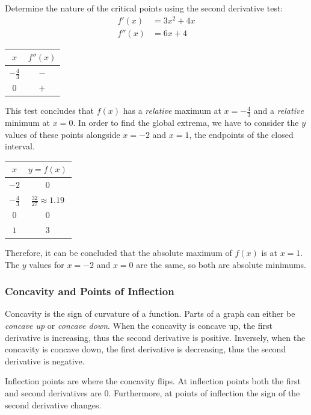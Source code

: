 \documentclass[12pt]{article}
\begin{document}
\noindent Determine the nature of the critical points using the second derivative test:
\begin{align*}
	f'(x) &= 3x^2 + 4x \\
	f''(x) &= 6x + 4
\end{align*}
\begin{table}[H]
	\centering
	\begin{tabular}{|c|c|}
		\hline
		$x$ & $f''(x)$ \\
		\hline \hline
		$-\frac{4}{3}$ & $-$ \\
		\hline
		$0$ & $+$ \\
		\hline
	\end{tabular}
\end{table}

\noindent This test concludes that $f(x)$ has a \textit{relative} maximum at $x = -\frac{4}{3}$ and a \textit{relative} minimum at $x = 0$. In order to find the global extrema, we have to consider the $y$ values of these points alongside $x = -2$ and $x = 1$, the endpoints of the closed interval.
\begin{table}[H]
	\centering
	\begin{tabular}{|c|c|}
		\hline
		$x$ & $y = f(x)$ \\
		\hline \hline
		$-2$ & $0$ \\
		\hline
		$-\frac{4}{3}$ & $\frac{32}{27} \approx 1.19$ \\
		\hline
		$0$ & $0$ \\
		\hline
		$1$ & $3$ \\
		\hline
	\end{tabular}
\end{table}

\noindent Therefore, it can be concluded that the absolute maximum of $f(x)$ is at $x = 1$. The $y$ values for $x = -2$ and $x = 0$ are the same, so both are absolute minimums.

\subsubsection{Concavity and Points of Inflection}
\label{sec:concavity}
Concavity is the sign of curvature of a function. Parts of a graph can either be \textit{concave up} or \textit{concave down}. When the concavity is concave up, the first derivative is increasing, thus the second derivative is positive. Inversely, when the concavity is concave down, the first derivative is decreasing, thus the second derivative is negative.

Inflection points are where the concavity flips. At inflection points both the first and second derivatives are $0$. Furthermore, at points of inflection the sign of the second derivative changes.
\end{document}
